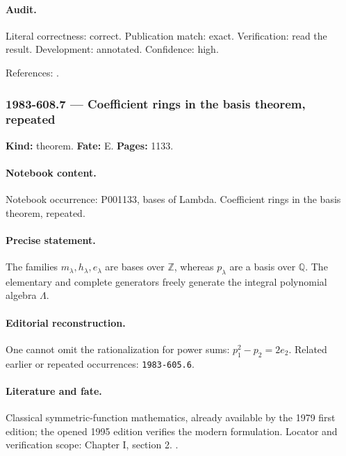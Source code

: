 \paragraph{Audit.} Literal correctness: correct. Publication match: exact. Verification: read the result. Development: annotated. Confidence: high.

\noindent References: \citep{macdonald1995symmetric}.\par

\subsubsection{1983-608.7 --- Coefficient rings in the basis theorem, repeated}

\label{item:1983-608.7}

\noindent\textbf{Kind:} theorem. \textbf{Fate:} E. \textbf{Pages:} 1133.\par

\paragraph{Notebook content.} Notebook occurrence: P001133, bases of Lambda. Coefficient rings in the basis theorem, repeated.

\paragraph{Precise statement.} The families \(m_\lambda,h_\lambda,e_\lambda\) are bases over \(\mathbb Z\), whereas \(p_\lambda\) are a basis over \(\mathbb Q\). The elementary and complete generators freely generate the integral polynomial algebra \(\Lambda\).

\paragraph{Editorial reconstruction.} One cannot omit the rationalization for power sums: \(p_1^2-p_2=2e_2\). Related earlier or repeated occurrences: \texttt{1983-605.6}.

\paragraph{Literature and fate.} Classical symmetric-function mathematics, already available by the 1979 first edition; the opened 1995 edition verifies the modern formulation. Locator and verification scope: Chapter I, section 2. \cite{macdonald1995symmetric}.

